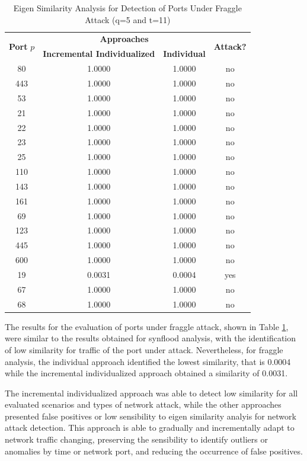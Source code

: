 \begin{table}[h!]
  \centering
  \caption{Eigen Similarity Analysis for Detection of Ports Under Fraggle Attack (q=5 and t=11)}
  \label{tab:tab10}
  \begin{tabular}{ c c c c }
	\toprule
	\multirow{2}{*}{\textbf{Port} $p$}   &\multicolumn{2}{c}{\textbf{Approaches}} &\multirow{2}{*}{\textbf{Attack?}}\\ 
			\hhline{~--~}
			&\textbf{Incremental Individualized} &\textbf{Individual}\\
	\midrule
	80 &1.0000 &1.0000 &no \\
	443 &1.0000 &1.0000 &no \\
	53 &1.0000 &1.0000 &no \\
	21 &1.0000 &1.0000 &no \\
	22 &1.0000 &1.0000 &no \\
	23 &1.0000 &1.0000 &no \\
	25 &1.0000 &1.0000 &no \\
	110 &1.0000 &1.0000 &no \\
	143 &1.0000 &1.0000 &no \\
	161 &1.0000 &1.0000 &no \\
	69 &1.0000 &1.0000 &no \\
	123 &1.0000 &1.0000 &no \\
	445 &1.0000 &1.0000 &no \\
	600 &1.0000 &1.0000 &no \\
	19 &0.0031 &0.0004 &yes \\
	67 &1.0000 &1.0000 &no \\
	68 &1.0000 &1.0000 &no \\
    \bottomrule
  \end{tabular}
\end{table}

The results for the evaluation of ports under fraggle attack, shown in Table \ref{tab:tab10}, were similar to the results obtained for synflood analysis, with the identification of low similarity for traffic of the port under attack. Nevertheless, for fraggle analysis, the individual approach identified the lowest similarity, that is 0.0004 while the incremental individualized approach obtained a similarity of 0.0031.

The incremental individualized approach was able to detect low similarity for all evaluated scenarios and types of network attack, while the other approaches presented false positives or low sensibility to eigen similarity analyis for network attack detection. This approach is able to gradually and incrementally adapt to network traffic changing, preserving the sensibility to identify outliers or anomalies by time or network port, and reducing the occurrence of false positives.

